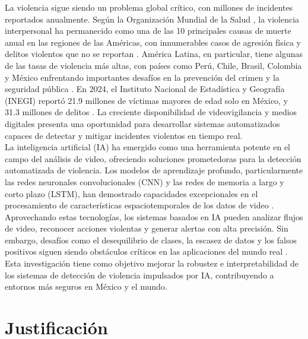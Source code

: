 La violencia sigue siendo un problema global crítico, con millones 
de incidentes reportados anualmente. Según la Organización Mundial 
de la Salud \cite{WorldHealthOrganization2024}, la violencia interpersonal ha permanecido como 
una de las 10 principales causas de muerte anual en las regiones 
de las Américas, con innumerables casos de agresión física y 
delitos violentos que no se reportan . 
América Latina, en particular, tiene algunas de las tasas de violencia 
más altas, con países como Perú, Chile, Brasil, Colombia y México 
enfrentando importantes desafíos en la prevención del crimen y 
la seguridad pública \cite{Bisca2024}. En 2024, el Instituto Nacional 
de Estadística y Geografía (INEGI) reportó 21.9 millones de víctimas 
mayores de edad solo en México, y 31.3 millones de delitos \cite{INEGI2024}. 
La creciente disponibilidad de videovigilancia y medios digitales 
presenta una oportunidad para desarrollar sistemas automatizados 
capaces de detectar y mitigar incidentes violentos en tiempo real.\\

La inteligencia artificial (IA) ha emergido como una herramienta 
potente en el campo del análisis de video, ofreciendo soluciones 
prometedoras para la detección automatizada de violencia. Los modelos 
de aprendizaje profundo, particularmente las redes neuronales 
convolucionales (CNN) y las redes de memoria a largo y corto plazo 
(LSTM), han demostrado capacidades excepcionales en el procesamiento 
de características espaciotemporales de los datos de video \cite{Orozco2021}. 
Aprovechando estas tecnologías, los sistemas basados en IA pueden 
analizar flujos de video, reconocer acciones violentas y generar alertas 
con alta precisión. Sin embargo, desafíos como el desequilibrio de clases, 
la escasez de datos y los falsos positivos siguen siendo obstáculos 
críticos en las aplicaciones del mundo real \cite{Kulkarni2021}. Esta 
investigación tiene como objetivo mejorar la robustez e interpretabilidad 
de los sistemas de detección de violencia impulsados por IA, contribuyendo 
a entornos más seguros en México y el mundo.

\section{Justificación}

